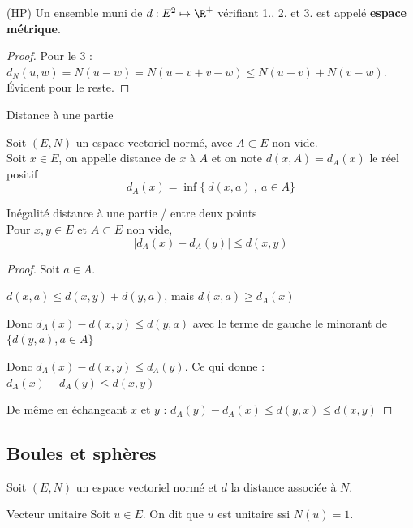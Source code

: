 \begin{remarque}
    (HP) Un ensemble muni de $d : E^2 \mapsto \R^{+}$ vérifiant 1., 2. et 3. est appelé \textbf{espace métrique}.
\end{remarque}

\begin{proof}
    Pour le 3 : $d_N(u, w) = N(u - w) = N( u - v + v - w) \leqslant N(u - v) + N(v - w)$.
    Évident pour le reste.
\end{proof}

\begin{definition}{Distance à une partie}{}

    Soit $(E, N)$ un espace vectoriel normé, avec $A \subset E$ non vide. \\

    Soit $x \in E$, on appelle distance de $x$ à $A$ et on note $d(x, A) = d_A(x)$ le réel positif
    \[d_A(x) = \inf \{~ d(x, a) ~,~ a \in A\}\]
\end{definition}

\begin{proposition}{Inégalité distance à une partie / entre deux points}{}
    \\Pour $x, y \in E$ et $A \subset E$ non vide, 
    \[|d_A(x) - d_A(y)| \leqslant d(x, y)\]
\end{proposition}


\begin{proof}
    Soit $a \in A$.

    $d(x, a) \leqslant d(x, y) + d(y, a)$, mais $d(x, a) \geqslant d_A(x)$

    Donc $d_A(x) - d(x, y) \leqslant d(y, a)$ avec le terme de gauche le minorant de
    $\{d(y, a), a \in A\}$

    Donc $d_A(x) - d(x, y) \leqslant d_A(y)$.
    Ce qui donne : $d_A(x) - d_A(y) \leqslant d(x, y)$

    De même en échangeant $x$ et $y$ : $d_A(y) - d_A(x) \leqslant d(y, x) \leqslant d(x, y)$
\end{proof}

\subsection{Boules et sphères}

Soit $(E, N)$ un espace vectoriel normé et $d$ la distance associée à $N$. 

\begin{definition}{Vecteur unitaire}{}
    Soit $u \in E$. On dit que $u$ est unitaire ssi $N(u) = 1$.
\end{definition}

